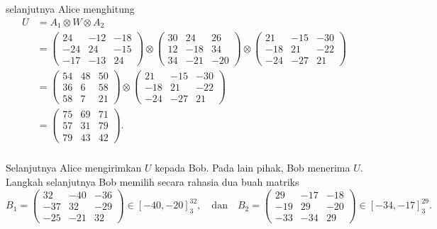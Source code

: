 \documentclass[aspectratio=169]{beamer}
\theoremstyle{definition}
\numberwithin{definisi}{section}
\begin{document}
\begin{frame}
  \frametitle{\insertsection}
  selanjutnya Alice menghitung
  \begin{align*}
    U & = A_1 \otimes W \otimes A_2 \\
      & =
    \begin{pmatrix}
      24  & -12 & -18 \\
      -24 & 24  & -15 \\
      -17 & -13 & 24
    \end{pmatrix}
    \otimes
    \begin{pmatrix}
      30 & 24  & 26  \\
      12 & -18 & 34  \\
      34 & -21 & -20
    \end{pmatrix}
    \otimes
    \begin{pmatrix}
      21  & -15 & -30 \\
      -18 & 21  & -22 \\
      -24 & -27 & 21
    \end{pmatrix}                 \\
      & =
    \begin{pmatrix}
      54 & 48 & 50 \\
      36 & 6  & 58 \\
      58 & 7  & 21
    \end{pmatrix}
    \otimes
    \begin{pmatrix}
      21  & -15 & -30 \\
      -18 & 21  & -22 \\
      -24 & -27 & 21
    \end{pmatrix}                 \\
      & =
    \begin{pmatrix}
      75 & 69 & 71 \\
      57 & 31 & 79 \\
      79 & 43 & 42
    \end{pmatrix}.
  \end{align*}
\end{frame}

\begin{frame}
  \frametitle{\insertsection}
  Selanjutnya Alice mengirimkan $U$ kepada Bob. Pada lain pihak, Bob menerima $U$. Langkah selanjutnya Bob memilih secara rahasia dua buah matriks
  \[
    B_1 =
    \begin{pmatrix}
      32  & -40 & -36 \\
      -37 & 32  & -29 \\
      -25 & -21 & 32
    \end{pmatrix}
    \in [-40, -20]^{32}_{3},
    \quad \text{dan} \quad
    B_2 =
    \begin{pmatrix}
      29  & -17 & -18 \\
      -19 & 29  & -20 \\
      -33 & -34 & 29
    \end{pmatrix}
    \in [-34, -17]^{29}_{3}.
  \]
\end{frame}
\end{document}
